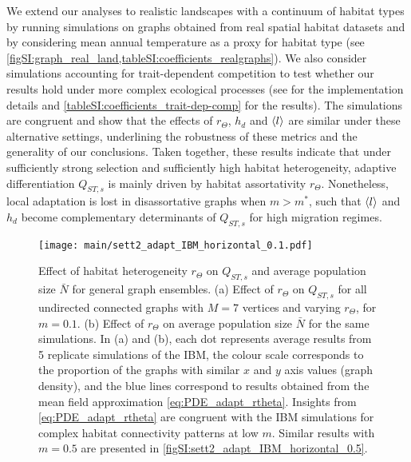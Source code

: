 We extend our analyses to realistic landscapes with a continuum of habitat types by running simulations on graphs obtained from real spatial habitat datasets and by considering mean annual temperature as a proxy for habitat type (see \cref{figSI:graph_real_land,tableSI:coefficients_realgraphs}). 
%
We also consider simulations accounting for trait-dependent competition to test whether our results hold under more complex ecological processes (see  for the implementation details and \cref{tableSI:coefficients_trait-dep-comp} for the results). 
%
The simulations are congruent and show that the effects of $r_\Theta$, $h_d$ and $\langle l \rangle$ are similar under these alternative settings, underlining the robustness of these metrics and the generality of our conclusions.
%
Taken together, these results indicate that under sufficiently strong selection and sufficiently high habitat heterogeneity, adaptive differentiation $Q_{ST,s}$ is mainly driven by habitat assortativity $r_\Theta$. 
%
Nonetheless, local adaptation is lost in disassortative graphs when $m > m^*$, such that $\langle l \rangle$ and $h_d$ become complementary determinants of $Q_{ST,s}$ for high migration regimes.

\begin{figure}[ht]
  \centering
    \texttt{[image: main/sett2\_adapt\_IBM\_horizontal\_0.1.pdf]}
    \caption{{\small Effect of habitat heterogeneity $r_\Theta$ on $Q_{ST,s}$ and average population size $\bar{N}$ for general graph ensembles. (a) Effect of $r_\Theta$ on $Q_{ST,s}$ for all undirected connected graphs with $M = 7$ vertices and varying $r_\Theta$, for $m = 0.1$. (b) Effect of $r_\Theta$ on average population size $\bar{N}$ for the same simulations. In (a) and (b), each dot represents average results from 5 replicate simulations of the IBM, the colour scale corresponds to the proportion of the graphs with similar $x$ and $y$ axis values (graph density), and the blue lines correspond to results obtained from the mean field approximation \cref{eq:PDE_adapt_rtheta}. Insights from \cref{eq:PDE_adapt_rtheta} are congruent with the IBM simulations for complex habitat connectivity patterns at low $m$. Similar results with $m=0.5$ are presented in \cref{figSI:sett2_adapt_IBM_horizontal_0.5}.}}
    \label{fig:sett2_adapt_IBM_horizontal_0.1}
\end{figure}
\FloatBarrier

